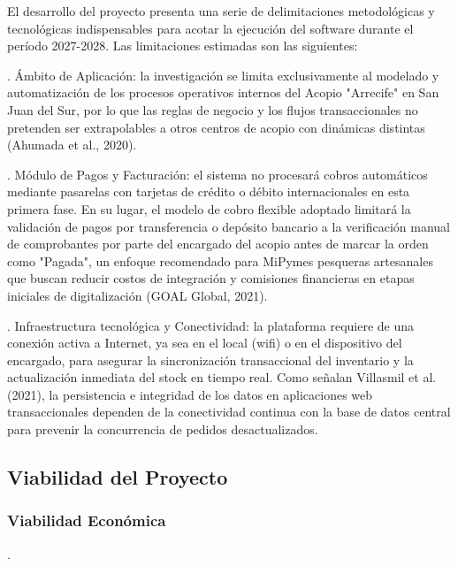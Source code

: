El desarrollo del proyecto presenta una serie de delimitaciones metodológicas y tecnológicas indispensables para acotar la ejecución del software durante el período 2027-2028. Las limitaciones estimadas son las siguientes:

. Ámbito de Aplicación: la investigación se limita exclusivamente al modelado y automatización de los procesos operativos internos del Acopio "Arrecife" en San Juan del Sur, por lo que las reglas de negocio y los flujos transaccionales no pretenden ser extrapolables a otros centros de acopio con dinámicas distintas (Ahumada et al., 2020).

. Módulo de Pagos y Facturación: el sistema no procesará cobros automáticos mediante pasarelas con tarjetas de crédito o débito internacionales en esta primera fase. En su lugar, el modelo de cobro flexible adoptado limitará la validación de pagos por transferencia o depósito bancario a la verificación manual de comprobantes por parte del encargado del acopio antes de marcar la orden como "Pagada", un enfoque recomendado para MiPymes pesqueras artesanales que buscan reducir costos de integración y comisiones financieras en etapas iniciales de digitalización (GOAL Global, 2021).

. Infraestructura tecnológica y Conectividad: la plataforma requiere de una conexión activa a Internet, ya sea en el local (wifi) o en el dispositivo del encargado, para asegurar la sincronización transaccional del inventario y la actualización inmediata del stock en tiempo real. Como señalan Villasmil et al. (2021), la persistencia e integridad de los datos en aplicaciones web transaccionales dependen de la conectividad continua con la base de datos central para prevenir la concurrencia de pedidos desactualizados.


\subsection{Viabilidad del Proyecto}

\subsubsection{Viabilidad Económica} .

